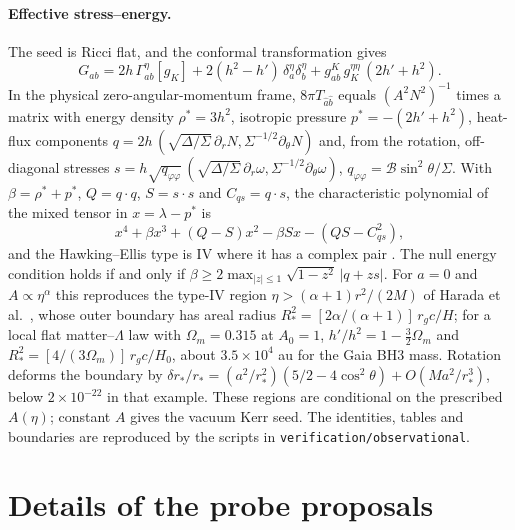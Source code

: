 \documentclass[12pt]{iopart}
\theoremstyle{plain}
\theoremstyle{definition}
\theoremstyle{remark}
\begin{document}
\paragraph{Effective stress--energy.}
The seed is Ricci flat, and the conformal transformation gives
\begin{equation}
    G_{ab}=2h\,\Gamma^{\eta}_{ab}[g_K]+2(h^2-h')\,\delta_a^{\eta}\delta_b^{\eta}
          +g^K_{ab}\,g_K^{\eta\eta}\,(2h'+h^2).
    \label{eq:einstein-tk}
\end{equation}
In the physical zero-angular-momentum frame, $8\pi T_{\hat a\hat b}$ equals
$(A^2N^2)^{-1}$ times a matrix with energy density $\rho^\ast=3h^2$, isotropic
pressure $p^\ast=-(2h'+h^2)$, heat-flux components
$q=2h\,(\sqrt{\Delta/\Sigma}\,\partial_rN,\Sigma^{-1/2}\partial_\theta N)$ and, from the
rotation, off-diagonal stresses
$s=h\sqrt{q_{\varphi\varphi}}\,(\sqrt{\Delta/\Sigma}\,\partial_r\omega,
\Sigma^{-1/2}\partial_\theta\omega)$, $q_{\varphi\varphi}=\mathcal B\sin^2\theta/\Sigma$.
With $\beta=\rho^\ast+p^\ast$, $Q=q\cdot q$, $S=s\cdot s$ and $C_{qs}=q\cdot s$, the
characteristic polynomial of the mixed tensor in $x=\lambda-p^\ast$ is
\begin{equation}
    x^4+\beta x^3+(Q-S)x^2-\beta Sx-(QS-C_{qs}^2),
\end{equation}
and the Hawking--Ellis type is IV where it has a complex pair
\cite{MartinMorunoVisser2018}. The null energy condition holds if and only if
$\beta\ge2\max_{|z|\le1}\sqrt{1-z^2}\,|q+zs|$. For $a=0$ and $A\propto\eta^\alpha$
this reproduces the type-IV region $\eta>(\alpha+1)r^2/(2M)$ of
Harada et al.\ \cite{Harada2022}, whose outer boundary has areal radius
$R_\ast^2=[2\alpha/(\alpha+1)]\,r_gc/H$; for a local flat matter--$\Lambda$ law with
$\Omega_m=0.315$ at $A_0=1$, $h'/h^2=1-\tfrac32\Omega_m$ and
$R_\ast^2=[4/(3\Omega_m)]\,r_gc/H_0$, about $3.5\times10^4$ au for the Gaia BH3
mass. Rotation deforms the boundary by
$\delta r_\ast/r_\ast=(a^2/r_\ast^2)(5/2-4\cos^2\theta)+O(Ma^2/r_\ast^3)$, below
$2\times10^{-22}$ in that example. These regions are conditional on the prescribed
$A(\eta)$; constant $A$ gives the vacuum Kerr seed. The identities, tables and
boundaries are reproduced by the scripts in \texttt{verification/observational}.

\section{Details of the probe proposals}
\label{app:probe-details}
\end{document}
